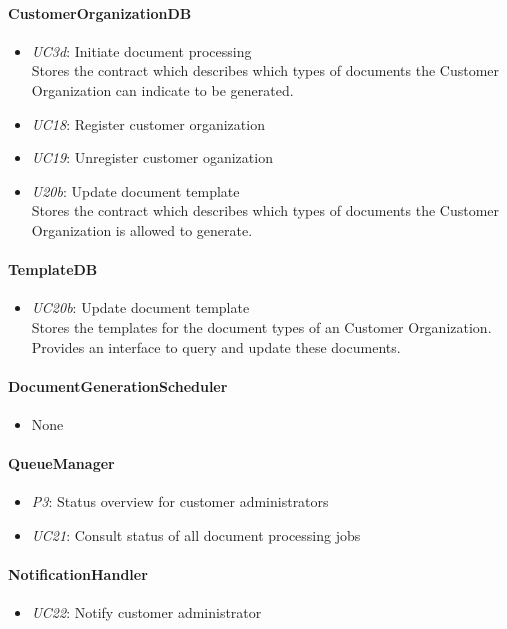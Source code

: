 \documentclass[a4paper,10pt]{article}
\begin{document}
\paragraph{CustomerOrganizationDB}
\begin{itemize}
	\item \emph{UC3d}: Initiate document processing\\ Stores the contract which describes which types of documents the Customer Organization can indicate to be generated.
	\item \emph{UC18}: Register customer organization
    \item \emph{UC19}: Unregister customer oganization
    \item \emph{U20b}: Update document template\\ Stores the contract which describes which types of documents the Customer Organization is allowed to generate.
\end{itemize}
\paragraph{TemplateDB}
\begin{itemize}
		\item \emph{UC20b}: Update document template\\ Stores the templates for the document types of an Customer Organization. Provides an interface to query and update these documents.
\end{itemize}
\paragraph{DocumentGenerationScheduler}
\begin{itemize}
	\item None
\end{itemize}
\paragraph{QueueManager}
\begin{itemize}
	\item \emph{P3}: Status overview for customer administrators
	\item \emph{UC21}: Consult status of all document processing jobs
\end{itemize}
\paragraph{NotificationHandler}
\begin{itemize}
	\item \emph{UC22}: Notify customer administrator
\end{itemize}
\end{document}
